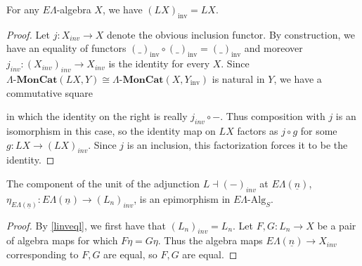 \documentclass{amsbook} %
\newcommand{\mb}{\mathbf}
\newcommand{\id}{\textrm{id}}
\newcommand{\ELAlg}{\lmc}
\newcommand{\lmc}{\Lambda\mbox{-}\mb{MonCat}}
\numberwithin{section}{chapter}
\begin{document}
\begin{prop} \label{linveql} For any $E\Lambda$-algebra $X$, we have $(LX)_{\mathrm{inv}} = LX$.
\end{prop}
\begin{proof}
Let $j \colon  X_{inv} \to X$ denote the obvious inclusion functor. By construction, we have an equality of functors $(\_)_{\mathrm{inv}} \circ (\_)_{\mathrm{inv}} = (\_)_{\mathrm{inv}}$ and moreover $j_{inv} \colon  (X_{inv})_{inv} \to X_{inv}$ is the identity for every $X$. Since $\ELAlg(LX , Y)\cong \ELAlg(X, Y_{\mathrm{inv}})$ is natural in $Y$, we have a commutative square
\begin{center}
    \end{center}
in which the identity on the right is really $j_{inv} \circ -$. Thus composition with $j$ is an isomorphism in this case, so the identity map on $LX$ factors as $j \circ g$ for some $g \colon  LX \to (LX)_{inv}$. Since $j$ is an inclusion, this factorization forces it to be the identity.
\end{proof}

\begin{cor} \label{epi} The component of the unit of the adjunction $L \dashv (-)_{inv}$ at $E\Lambda(\underline{n})$,  $\eta_{E\Lambda(\underline{n})} \colon  E\Lambda(\underline{n}) \to (L_n)_{inv}$, is an epimorphism in $E\Lambda\mbox{-}\mathrm{Alg}_S$.
\end{cor}
\begin{proof}
By \cref{linveql}, we first have that $(L_n)_{inv} = L_n$. Let $F,G \colon  L_n \to X$ be a pair of algebra maps for which $F \eta = G \eta$. Thus the algebra maps $E\Lambda(\underline{n}) \to X_{inv}$ corresponding to $F, G$ are equal, so $F,G$ are equal.
\end{proof}

\end{document}
